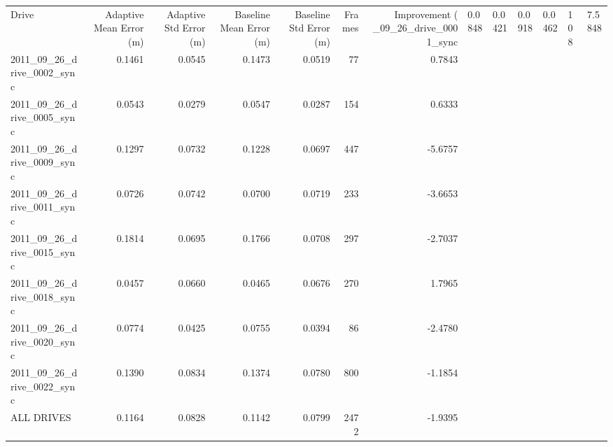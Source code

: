 \begin{tabular}{lrrrrrr}
\toprule
Drive & Adaptive Mean Error (m) & Adaptive Std Error (m) & Baseline Mean Error (m) & Baseline Std Error (m) & Frames & Improvement (%
_09_26_drive_0001_sync & 0.0848 & 0.0421 & 0.0918 & 0.0462 & 108 & 7.5848 \\
2011_09_26_drive_0002_sync & 0.1461 & 0.0545 & 0.1473 & 0.0519 & 77 & 0.7843 \\
2011_09_26_drive_0005_sync & 0.0543 & 0.0279 & 0.0547 & 0.0287 & 154 & 0.6333 \\
2011_09_26_drive_0009_sync & 0.1297 & 0.0732 & 0.1228 & 0.0697 & 447 & -5.6757 \\
2011_09_26_drive_0011_sync & 0.0726 & 0.0742 & 0.0700 & 0.0719 & 233 & -3.6653 \\
2011_09_26_drive_0015_sync & 0.1814 & 0.0695 & 0.1766 & 0.0708 & 297 & -2.7037 \\
2011_09_26_drive_0018_sync & 0.0457 & 0.0660 & 0.0465 & 0.0676 & 270 & 1.7965 \\
2011_09_26_drive_0020_sync & 0.0774 & 0.0425 & 0.0755 & 0.0394 & 86 & -2.4780 \\
2011_09_26_drive_0022_sync & 0.1390 & 0.0834 & 0.1374 & 0.0780 & 800 & -1.1854 \\
ALL DRIVES & 0.1164 & 0.0828 & 0.1142 & 0.0799 & 2472 & -1.9395 \\
\bottomrule
\end{tabular}
